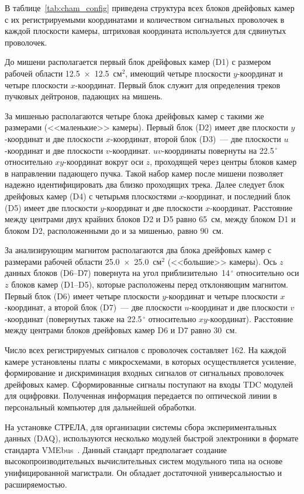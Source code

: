 В таблице~\ref{tab:cham_config} приведена структура всех блоков дрейфовых камер
с их регистрируемыми координатами и количеством сигнальных проволочек в каждой
плоскости камеры, штриховая координата используется для сдвинутых проволочек.


До мишени располагается первый блок дрейфовых камер (D1) с размером рабочей
области 12.5~$\times$~12.5~см$^2$, имеющий четыре плоскости $y$-координат и
четыре плоскости $x$-координат. Первый блок служит для определения треков
пучковых дейтронов, падающих на мишень.

За мишенью располагаются четыре блока дрейфовых камер с такими же размерами
(<<маленькие>> камеры). Первый блок (D2) имеет две плоскости $y$-координат и две
плоскости $x$-координат, второй блок (D3)~--- две плоскости $u$-координат и две
плоскости $v$-координат. $uv$-координаты повернуты на 22.5$^{\,\circ}$
относительно $xy$-координат вокруг оси $z$, проходящей через центры блоков камер
в направлении падающего пучка. Такой набор камер после мишени позволяет надежно
идентифицировать два близко проходящих трека. Далее следует блок дрейфовых камер
(D4) с четырьмя плоскостями $x$-координат, и последний блок (D5) имеет две
плоскости $y$-координат и две плоскости $x$-координат.  Расстояние между
центрами двух крайних блоков D2 и D5 равно 65~см, между блоком D1 и блоком D2,
расположенными до и за мишенью, равно 90~см.

За анализирующим магнитом располагаются два блока дрейфовых камер с размерами
рабочей области 25.0~$\times$~25.0~см$^2$ (<<большие>> камеры). Ось $z$ данных
блоков (D6--D7) повернута на угол приблизительно~14$^{\,\circ}$ относительно оси
$z$ блоков камер (D1--D5), которые расположены перед отклоняющим магнитом.
Первый блок (D6) имеет четыре плоскости $y$-координат и четыре плоскости
$x$-координат, а второй блок (D7)~--- две плоскости $u$-координат и две
плоскости $v$-координат (повернутых также на 22.5$^{\,\circ}$ относительно
$xy$-координат). Расстояние между центрами блоков дрейфовых камер D6 и D7 равно
30~см.

Число всех регистрируемых сигналов с проволочек составляет 162. На каждой камере
установлены платы с микросхемами, в которых осуществляется усиление,
формирование и дискриминация входных сигналов от сигнальных проволочек дрейфовых
камер. Сформированные сигналы поступают на входы TDC модулей для оцифровки.
Полученная информация передается по оптической линии в персональный компьютер
для дальнейшей обработки.

На установке СТРЕЛА, для организации системы сбора экспериментальных данных
(DAQ), используются несколько модулей быстрой электроники в формате стандарта
VMEbus~\cite{vme85}. Данный стандарт предполагает создание
высокопроизводительных вычислительных систем модульного типа на основе
унифицированной магистрали. Он обладает достаточной универсальностью и
расширяемостью.

